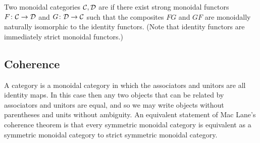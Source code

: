 Two monoidal categories $\mathcal C, \mathcal D$ are  if
there exist strong monoidal functors $F{\colon} \mathcal C \to \mathcal D$ and $G{\colon} \mathcal D
\to \mathcal C$ such that the composites $FG$ and $GF$ are monoidally naturally
isomorphic to the identity functors. (Note that identity functors are
immediately strict monoidal functors.)

\subsection{Coherence}
A  category is a monoidal category in which the
associators and unitors are all identity maps. In this case then any two objects
that can be related by associators and unitors are equal, and so we may write
objects without parentheses and units without ambiguity. An equivalent statement
of Mac Lane's coherence theorem is that every symmetric monoidal category is
equivalent as a symmetric monoidal category to strict symmetric monoidal category. 

